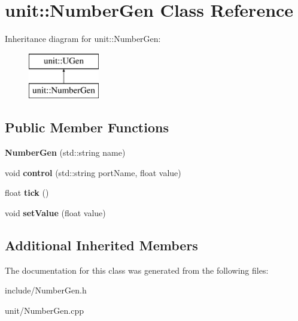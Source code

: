 \hypertarget{classunit_1_1NumberGen}{}\section{unit\+:\+:Number\+Gen Class Reference}
\label{classunit_1_1NumberGen}
Inheritance diagram for unit\+:\+:Number\+Gen\+:\begin{figure}[H]
\begin{center}
\leavevmode
\includegraphics[height=2.000000cm]{classunit_1_1NumberGen}
\end{center}
\end{figure}
\subsection*{Public Member Functions}
\begin{DoxyCompactItemize}
\item 
{\bfseries Number\+Gen} (std\+::string name)\hypertarget{classunit_1_1NumberGen_a6e93812c4805a43f19f8fb11680e32a4}{}\label{classunit_1_1NumberGen_a6e93812c4805a43f19f8fb11680e32a4}

\item 
void {\bfseries control} (std\+::string port\+Name, float value)\hypertarget{classunit_1_1NumberGen_a9daaaf8a12389873494bb1ad2f877c8c}{}\label{classunit_1_1NumberGen_a9daaaf8a12389873494bb1ad2f877c8c}

\item 
float {\bfseries tick} ()\hypertarget{classunit_1_1NumberGen_a38cef7d64a12e40bf2ae14f29def41ca}{}\label{classunit_1_1NumberGen_a38cef7d64a12e40bf2ae14f29def41ca}

\item 
void {\bfseries set\+Value} (float value)\hypertarget{classunit_1_1NumberGen_ad5c107c90a5bc6cf7bbc39562db9d9e3}{}\label{classunit_1_1NumberGen_ad5c107c90a5bc6cf7bbc39562db9d9e3}

\end{DoxyCompactItemize}
\subsection*{Additional Inherited Members}


The documentation for this class was generated from the following files\+:\begin{DoxyCompactItemize}
\item 
include/Number\+Gen.\+h\item 
unit/Number\+Gen.\+cpp\end{DoxyCompactItemize}
